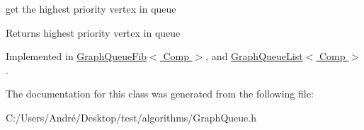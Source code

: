 get the highest priority vertex in queue 

\begin{DoxyReturn}{Returns}
highest priority vertex in queue 
\end{DoxyReturn}


Implemented in \hyperlink{class_graph_queue_fib_a3b1b6a0bf8007559ba3f66978413845c}{Graph\+Queue\+Fib$<$ Comp $>$}, and \hyperlink{class_graph_queue_list_a56493dd03e8378a67033eaba8c71d9ea}{Graph\+Queue\+List$<$ Comp $>$}.



The documentation for this class was generated from the following file\+:\begin{DoxyCompactItemize}
\item 
C\+:/\+Users/\+André/\+Desktop/test/algorithms/Graph\+Queue.\+h\end{DoxyCompactItemize}
